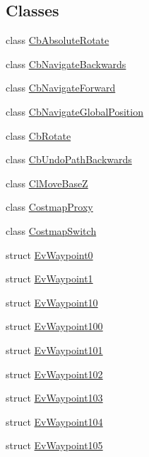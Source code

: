 \subsection*{Classes}
\begin{DoxyCompactItemize}
\item 
class \hyperlink{classmove__base__z__client_1_1CbAbsoluteRotate}{Cb\+Absolute\+Rotate}
\item 
class \hyperlink{classmove__base__z__client_1_1CbNavigateBackwards}{Cb\+Navigate\+Backwards}
\item 
class \hyperlink{classmove__base__z__client_1_1CbNavigateForward}{Cb\+Navigate\+Forward}
\item 
class \hyperlink{classmove__base__z__client_1_1CbNavigateGlobalPosition}{Cb\+Navigate\+Global\+Position}
\item 
class \hyperlink{classmove__base__z__client_1_1CbRotate}{Cb\+Rotate}
\item 
class \hyperlink{classmove__base__z__client_1_1CbUndoPathBackwards}{Cb\+Undo\+Path\+Backwards}
\item 
class \hyperlink{classmove__base__z__client_1_1ClMoveBaseZ}{Cl\+Move\+BaseZ}
\item 
class \hyperlink{classmove__base__z__client_1_1CostmapProxy}{Costmap\+Proxy}
\item 
class \hyperlink{classmove__base__z__client_1_1CostmapSwitch}{Costmap\+Switch}
\item 
struct \hyperlink{structmove__base__z__client_1_1EvWaypoint0}{Ev\+Waypoint0}
\item 
struct \hyperlink{structmove__base__z__client_1_1EvWaypoint1}{Ev\+Waypoint1}
\item 
struct \hyperlink{structmove__base__z__client_1_1EvWaypoint10}{Ev\+Waypoint10}
\item 
struct \hyperlink{structmove__base__z__client_1_1EvWaypoint100}{Ev\+Waypoint100}
\item 
struct \hyperlink{structmove__base__z__client_1_1EvWaypoint101}{Ev\+Waypoint101}
\item 
struct \hyperlink{structmove__base__z__client_1_1EvWaypoint102}{Ev\+Waypoint102}
\item 
struct \hyperlink{structmove__base__z__client_1_1EvWaypoint103}{Ev\+Waypoint103}
\item 
struct \hyperlink{structmove__base__z__client_1_1EvWaypoint104}{Ev\+Waypoint104}
\item 
struct \hyperlink{structmove__base__z__client_1_1EvWaypoint105}{Ev\+Waypoint105}
\item 

\end{DoxyCompactItemize}

